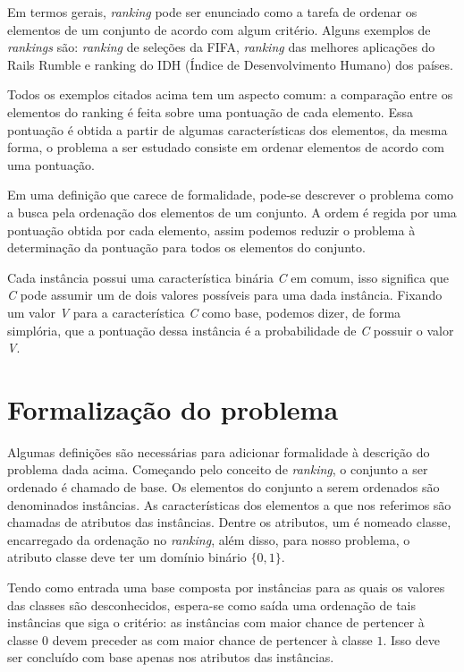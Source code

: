 Em termos gerais, \emph{ranking} pode ser enunciado como a tarefa de
ordenar os elementos de um conjunto de acordo com algum critério. Alguns
exemplos de \emph{rankings} são: \emph{ranking} de seleções da FIFA,
\emph{ranking} das melhores aplicações do Rails Rumble e ranking do IDH
(Índice de Desenvolvimento Humano) dos países.

Todos os exemplos citados acima tem um aspecto comum: a comparação entre os
elementos do ranking é feita sobre uma pontuação de cada elemento. Essa
pontuação é obtida a partir de algumas características dos elementos, da mesma
forma, o problema a ser estudado consiste em ordenar elementos de acordo com
uma pontuação.

Em uma definição que carece de formalidade, pode-se descrever o problema como
a busca pela ordenação dos elementos de um conjunto. A ordem é regida por uma
pontuação obtida por cada elemento, assim podemos reduzir o problema à
determinação da pontuação para todos os elementos do conjunto.

Cada instância possui uma característica binária \emph{C} em comum, isso
significa que \emph{C} pode assumir um de dois valores possíveis para uma dada
instância. Fixando um valor \emph{V} para a característica \emph{C} como base,
podemos dizer, de forma simplória, que a pontuação dessa instância é a
probabilidade de \emph{C} possuir o valor \emph{V}.

\section{Formalização do problema}
Algumas definições são necessárias para adicionar formalidade à descrição do
problema dada acima. Começando pelo conceito de \emph{ranking}, o conjunto a
ser ordenado é chamado de base. Os elementos do conjunto a serem ordenados são
denominados instâncias. As características dos elementos a que nos referimos
são chamadas de atributos das instâncias. Dentre os atributos, um é nomeado
classe, encarregado da ordenação no \emph{ranking}, além disso, para nosso
problema, o atributo classe deve ter um domínio binário $\{0, 1\}$.

Tendo como entrada uma base composta por instâncias para as quais os valores
das classes são desconhecidos, espera-se como saída uma ordenação de tais
instâncias que siga o critério: as instâncias com maior chance de pertencer à
classe $0$ devem preceder as com maior chance de pertencer à classe $1$. Isso
deve ser concluído com base apenas nos atributos das instâncias.

